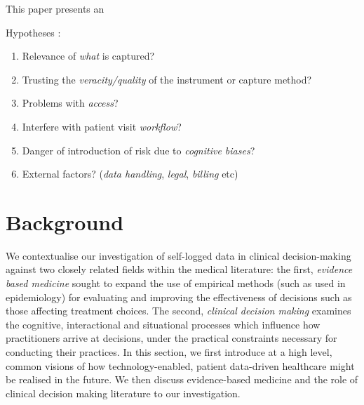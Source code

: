 \documentclass{sigchi}
\begin{document}
This paper presents an 


Hypotheses :

\begin{enumerate}
    \item Relevance of \emph{what} is captured?
    \item Trusting the \emph{veracity/quality} of the instrument or capture method?
    \item Problems with \emph{access}?
    \item Interfere with patient visit \emph{workflow}?
    \item Danger of introduction of risk due to \emph{cognitive biases}?
    \item External factors? (\emph{data handling}, \emph{legal}, \emph{billing} etc)
\end{enumerate}

\section{Background} 

We contextualise our investigation of self-logged data in clinical decision-making against two closely related fields within the medical literature: the first, \emph{evidence based medicine} sought to expand the use of empirical methods (such as used in epidemiology) for evaluating and improving the effectiveness of decisions such as those affecting treatment choices.  The second, \emph{clinical decision making} examines the cognitive, interactional and situational processes which influence how practitioners arrive at decisions, under the practical constraints necessary for conducting their practices.  In this section, we first introduce at a high level, common visions of how technology-enabled, patient data-driven healthcare might be realised in the future.  We then discuss evidence-based medicine and the role of clinical decision making literature to our investigation.
\end{document}
